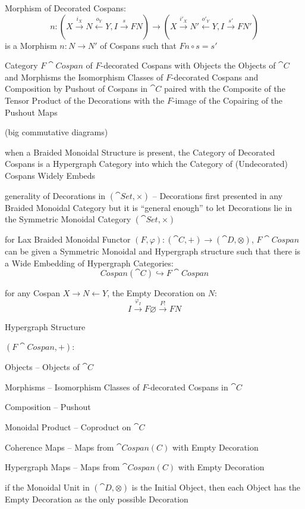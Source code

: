 Morphism of Decorated Cospans:
\[
  n: (X \xrightarrow{i_X} N \xleftarrow{o_Y} Y, I \xrightarrow{s} F N)
    \rightarrow (X \xrightarrow{i'_X} N' \xleftarrow{o'_Y} Y,
      I \xrightarrow{s'} F N')
\]
is a Morphism $n : N \rightarrow N'$ of Cospans such that $F n \circ s
= s'$

Category $F\cat{Cospan}$ of $F$-decorated Cospans with Objects the
Objects of $\cat{C}$ and Morphisms the Isomorphism Classes of
$F$-decorated Cospans and Composition by Pushout of Cospans in
$\cat{C}$ paired with the Composite of the Tensor Product of the
Decorations with the $F$-image of the Copairing of the Pushout Maps

(big commutative diagrams) %

when a Braided Monoidal Structure is present, the Category of
Decorated Cospans is a Hypergraph Category into which the Category of
(Undecorated) Cospans Widely Embeds

generality of Decorations in $(\cat{Set}, \times)$ -- Decorations
first presented in any Braided Monoidal Category but it is ``general
enough'' to let Decorations lie in the Symmetric Monoidal Category
$(\cat{Set}, \times)$ %

for Lax Braided Monoidal Functor $(F,\varphi): (\cat{C},+) \rightarrow
(\cat{D},\otimes)$, $F\cat{Cospan}$ can be given a Symmetric Monoidal
and Hypergraph structure such that there is a Wide Embedding of
Hypergraph Categories:
\[
  Cospan(\cat{C}) \hookrightarrow F\cat{Cospan}
\]

for any Cospan $X \rightarrow N \leftarrow Y$, the Empty Decoration on
$N$:
\[
  I \xrightarrow{\varphi_I} F \varnothing \xrightarrow{F!} F N
\]


Hypergraph Structure

$(F\cat{Cospan}, +)$:

Objects -- Objects of $\cat{C}$

Morphisms -- Isomorphism Classes of $F$-decorated Cospans in $\cat{C}$

Composition -- Pushout

Monoidal Product -- Coproduct on $\cat{C}$

Coherence Maps -- Maps from $\cat{Cospan(C)}$ with Empty Decoration

Hypergraph Maps -- Maps from $\cat{Cospan(C)}$ with Empty Decoration


if the Monoidal Unit in $(\cat{D}, \otimes)$ is the Initial Object,
then each Object has the Empty Decoration as the only possible
Decoration


